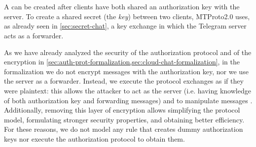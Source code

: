 \section{\Schat{}}
\label{sec:secret-chat-formalization}
A \schat{} can be created after clients have both shared an authorization key with the server. To create a shared secret (the \textit{\schat{} key}) between two clients, MTProto2.0 uses, as already seen in \cref{sec:secret-chat}, a \DiHe{} key exchange in which the Telegram server acts as a forwarder.

As we have already analyzed the security of the authorization protocol and of the \cchat{} encryption in \cref{sec:auth-prot-formalization,sec:cloud-chat-formalization}, in the formalization we do not encrypt messages with the authorization key, nor we use the server as a forwarder. Instead, we execute the \schat{} protocol exchanges as if they were plaintext: this allows the attacker to act as the server (i.e. having knowledge of both authorization key and forwarding messages) and to manipulate messages \cite{MTProto2-Proverif}. Additionally, removing this layer of encryption allows simplifying the protocol model, formulating stronger security properties, and obtaining better efficiency. For these reasons, we do not model any rule that creates dummy authorization keys nor execute the authorization protocol to obtain them.


